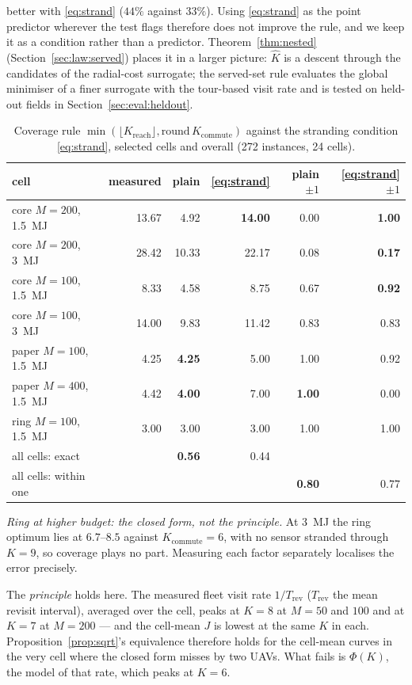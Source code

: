 \documentclass[journal,outdir=./]{IEEEtran}
\newcommand{\Kr}{K_{\mathrm{reach}}}
\newcommand{\Kc}{K_{\mathrm{commute}}}
\begin{document}
better with \eqref{eq:strand} ($44\%$ against $33\%$). Using \eqref{eq:strand} as the point predictor wherever the test flags therefore does not improve the rule, and we keep it as a condition rather than a predictor. Theorem~\ref{thm:nested} (Section~\ref{sec:law:served}) places it in a larger picture: $\hat K$ is a descent through the candidates of the radial-cost surrogate; the served-set rule evaluates the global minimiser of a finer surrogate with the tour-based visit rate and is tested on held-out fields in Section~\ref{sec:eval:heldout}.

\begin{table}[t]\centering
\footnotesize\setlength{\tabcolsep}{3pt}
\caption{Coverage rule $\min(\lfloor\Kr\rfloor,\mathrm{round}\,\Kc)$ against the stranding condition \eqref{eq:strand}, selected cells and overall (272 instances, 24 cells).}
\label{tab:strand}
\begin{tabular}{lrrrrr}
\toprule
cell & measured & plain & \eqref{eq:strand} & plain $\pm1$ & \eqref{eq:strand} $\pm1$\\
\midrule
core $M{=}200$, 1.5~MJ & 13.67 & 4.92 & \textbf{14.00} & 0.00 & \textbf{1.00}\\
core $M{=}200$, 3~MJ & 28.42 & 10.33 & 22.17 & 0.08 & \textbf{0.17}\\
core $M{=}100$, 1.5~MJ & 8.33 & 4.58 & 8.75 & 0.67 & \textbf{0.92}\\
core $M{=}100$, 3~MJ & 14.00 & 9.83 & 11.42 & 0.83 & 0.83\\
paper $M{=}100$, 1.5~MJ & 4.25 & \textbf{4.25} & 5.00 & 1.00 & 0.92\\
paper $M{=}400$, 1.5~MJ & 4.42 & \textbf{4.00} & 7.00 & \textbf{1.00} & 0.00\\
ring $M{=}100$, 1.5~MJ & 3.00 & 3.00 & 3.00 & 1.00 & 1.00\\
\midrule
all cells: exact & & \textbf{0.56} & 0.44 & & \\
all cells: within one & & & & \textbf{0.80} & 0.77\\
\bottomrule
\end{tabular}
\end{table}


\textit{Ring at higher budget: the closed form, not the principle.} At 3~MJ the ring optimum lies at $6.7$--$8.5$ against $\Kc=6$, with no sensor stranded through $K=9$, so coverage plays no part. Measuring each factor separately localises the error precisely.

The \emph{principle} holds here. The measured fleet visit rate $1/T_{\mathrm{rev}}$ ($T_{\mathrm{rev}}$ the mean revisit interval), averaged over the cell, peaks at $K=8$ at $M=50$ and $100$ and at $K=7$ at $M=200$ --- and the cell-mean $J$ is lowest at the same $K$ in each. Proposition~\ref{prop:sqrt}'s equivalence therefore holds for the cell-mean curves in the very cell where the closed form misses by two UAVs. What fails is $\Phi(K)$, the model of that rate, which peaks at $K=6$.
\end{document}
